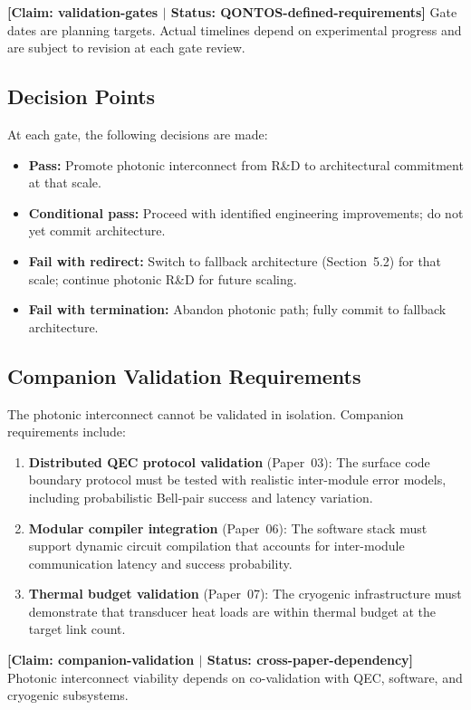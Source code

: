 \documentclass[conference]{IEEEtran}
\begin{document}
\textbf{[Claim: validation-gates $|$ Status: QONTOS-defined-requirements]} Gate dates are planning targets. Actual timelines depend on experimental progress and are subject to revision at each gate review.

\subsection{Decision Points}

At each gate, the following decisions are made:
\begin{itemize}
\item \textbf{Pass:} Promote photonic interconnect from R\&D to architectural commitment at that scale.
\item \textbf{Conditional pass:} Proceed with identified engineering improvements; do not yet commit architecture.
\item \textbf{Fail with redirect:} Switch to fallback architecture (Section~5.2) for that scale; continue photonic R\&D for future scaling.
\item \textbf{Fail with termination:} Abandon photonic path; fully commit to fallback architecture.
\end{itemize}

\subsection{Companion Validation Requirements}

The photonic interconnect cannot be validated in isolation. Companion requirements include:
\begin{enumerate}
\item \textbf{Distributed QEC protocol validation} (Paper~03): The surface code boundary protocol must be tested with realistic inter-module error models, including probabilistic Bell-pair success and latency variation.
\item \textbf{Modular compiler integration} (Paper~06): The software stack must support dynamic circuit compilation that accounts for inter-module communication latency and success probability.
\item \textbf{Thermal budget validation} (Paper~07): The cryogenic infrastructure must demonstrate that transducer heat loads are within thermal budget at the target link count.
\end{enumerate}

\textbf{[Claim: companion-validation $|$ Status: cross-paper-dependency]} Photonic interconnect viability depends on co-validation with QEC, software, and cryogenic subsystems.
\end{document}
